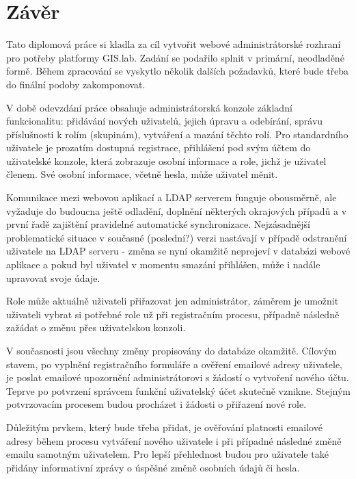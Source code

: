 \chapter{Závěr}
\label{5-zaver}


Tato diplomová práce si kladla za cíl vytvořit webové administrátorské rozhraní pro potřeby platformy GIS.lab. Zadání se podařilo splnit v primární, neodladěné formě. Během zpracování se vyskytlo několik dalších požadavků, které bude třeba do finální podoby zakomponovat.

V době odevzdání práce obsahuje administrátorská konzole základní funkcionalitu: přidávání nových uživatelů, jejich úpravu a odebírání, správu příslušnosti k rolím (skupinám), vytváření a mazání těchto rolí. Pro standardního uživatele je prozatím dostupná registrace, přihlášení pod svým účtem do uživatelské konzole, která zobrazuje osobní informace a role, jichž je uživatel členem. Své osobní informace, včetně hesla, může uživatel měnit. 

Komunikace mezi webovou aplikací a LDAP serverem funguje obousměrně, ale vyžaduje do budoucna ještě odladění, doplnění některých okrajových případů a v první řadě zajištění pravidelné automatické synchronizace. Nejzásadnější problematické situace v současné (poslední?) verzi nastávají v případě odstranění uživatele na LDAP serveru - změna se nyní okamžitě neprojeví v databázi webové aplikace a pokud byl uživatel v momentu smazání přihlášen, může i nadále upravovat svoje údaje.

Role může aktuálně uživateli přiřazovat jen administrátor, záměrem je umožnit uživateli vybrat si potřebné role už při registračním procesu, případně následně zažádat o změnu přes uživatelskou konzoli.

V současnosti jsou všechny změny propisovány do databáze okamžitě. Cílovým stavem, po vyplnění registračního formuláře a ověření emailové adresy uživatele, je poslat emailové upozornění administrátorovi s žádostí o vytvoření nového účtu. Teprve po potvrzení správcem funkční uživatelský účet skutečně vznikne. Stejným potvrzovacím procesem budou procházet i žádosti o přiřazení nové role.

Důležitým prvkem, který bude třeba přidat, je ověřování platnosti emailové adresy během procesu vytváření nového uživatele i při případné následné změně emailu samotným uživatelem. Pro lepší přehlednost budou pro uživatele také přidány informativní zprávy o úspěšné změně osobních údajů či hesla.

